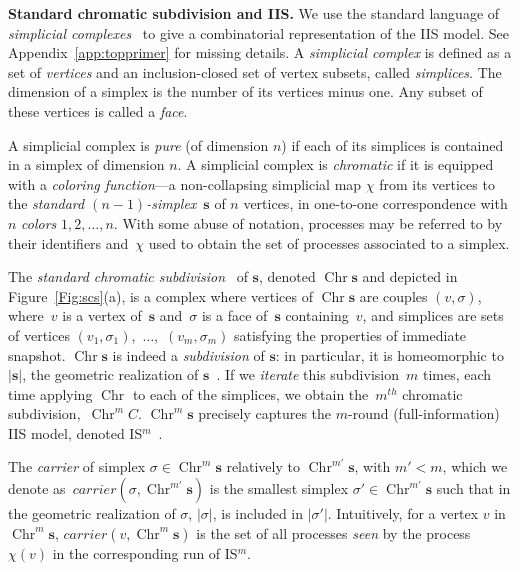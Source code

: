 \documentclass[a4paper]{article}
\newcommand{\myparagraph}[1]{\vspace{6pt}\noindent \textbf{#1}}
\def\s {\mathbf{s}}
\def\Chr{\operatorname{Chr}}
\def\Car{\mathit{carrier}}
\begin{document}
\myparagraph{Standard chromatic subdivision and IIS.}
%
We use the standard language of \emph{simplicial
  complexes}~\cite{Spanier,HKR14} to give a combinatorial
representation of the IIS model. See Appendix~\ref{app:topprimer} for
missing details.
A \emph{simplicial complex} is defined as a set of 
\emph{vertices} and an inclusion-closed set of vertex subsets, 
called \emph{simplices}. The dimension of a simplex is 
the number of its vertices minus one. Any subset of these 
vertices is called a \emph{face}. 


A simplicial complex is \emph{pure} (of dimension $n$) if each of its simplices 
is contained in a simplex of dimension $n$.
A simplicial complex is \emph{chromatic} if it is equipped with 
a \emph{coloring function}---a non-collapsing simplicial map $\chi$ from its vertices to 
the {\em standard $(n-1)$-simplex}~$\s$ of $n$ vertices, in 
one-to-one correspondence with $n$ {\em colors} $1,2, \dots, n$. 
With some abuse of notation, processes may be referred to 
by their identifiers and~$\chi$ used to obtain 
the set of processes associated to a simplex.
%

The \emph{standard chromatic subdivision}~\cite{HS99} of $\s$, denoted
$\Chr\s$ and depicted in Figure~\ref{Fig:scs}(a), is a complex where vertices of $\Chr\s$ are couples $(v, \sigma)$, where~$v$ is a 
vertex of~$\s$ and~$\sigma$ is a face of~$\s$ containing~$v$, and
simplices are sets of vertices
$(v_1,\sigma_1)$,~$\ldots$,~$(v_m,\sigma_m)$  satisfying the
properties of immediate snapshot. 
%
$\Chr\s$ is indeed a \emph{subdivision} of $\s$: in particular, 
it is homeomorphic to $|\s|$, the geometric realization of $\s$~\cite{Koz12}.
%
If we \emph{iterate} this subdivision~$m$ times, each time 
applying $\Chr$ to each of the simplices, we 
obtain the~$m^{th}$ chromatic subdivision,~$\Chr^m C$.
$\Chr^m \s$ precisely captures  the $m$-round 
(full-information) IIS model, denoted IS$^m$~\cite{HS99}.

The \emph{carrier} of simplex $\sigma\in\Chr^m\s$ relatively to $\Chr^{m'}\s$, 
with $m'<m$, which we denote as~$\Car(\sigma,\Chr^{m'}\s)$ is 
the smallest simplex $\sigma'\in\Chr^{m'}\s$ such that in the geometric 
realization of $\sigma$, $|\sigma|$, is included in $|\sigma'|$. 
Intuitively, for a vertex $v$ in $\Chr^m\s$, 
$\Car(v,\Chr^m\s)$ is the set of all processes \emph{seen} by 
the process~$\chi(v)$ in the corresponding run of IS$^m$.
\end{document}
